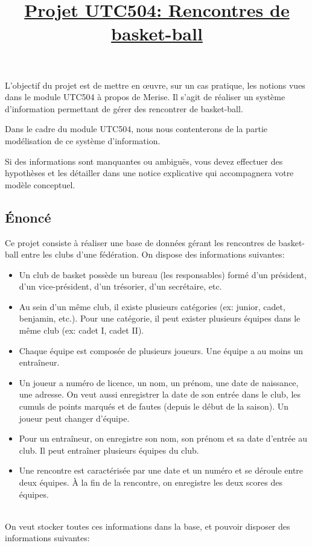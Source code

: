 \documentclass[a4,12pt]{article}
\title{\underline{Projet UTC504: Rencontres de basket-ball}}
\author{}
\date{}
\begin{document}
\maketitle

L'objectif du projet est de mettre en {\oe}uvre, sur un cas pratique, les
notions vues dans le module UTC504 à propos de Merise. Il s'agit de réaliser un
système d'information permettant de gérer des rencontrer de basket-ball.

Dans le cadre du module UTC504, nous nous contenterons de la partie modélisation
de ce système d'information.

Si des informations sont manquantes ou ambiguës, vous devez effectuer des
hypothèses et les détailler dans une notice explicative qui accompagnera votre
modèle conceptuel.

\subsection*{Énoncé}
Ce projet consiste à réaliser une base de données gérant les rencontres de
basket-ball entre les clubs d'une fédération. On dispose des informations
suivantes:
\begin{itemize}
  \item Un club de basket possède un bureau (les responsables) formé d'un
    président, d'un vice-président, d'un trésorier, d'un secrétaire, etc.
  \item Au sein d'un même club, il existe plusieurs catégories (ex: junior,
    cadet, benjamin, etc.). Pour une catégorie, il peut exister plusieurs
    équipes dans le même club (ex: cadet I, cadet II).
  \item Chaque équipe est composée de plusieurs joueurs. Une équipe a au moins
    un entraîneur.
  \item Un joueur a numéro de licence, un nom, un prénom, une date de naissance,
    une adresse. On veut aussi enregistrer la date de son entrée dans le club,
    les cumuls de points marqués et de fautes (depuis le début de la saison). Un
    joueur peut changer d'équipe.
  \item Pour un entraîneur, on enregistre son nom, son prénom et sa date
    d'entrée au club. Il peut entraîner plusieurs équipes du club.
  \item Une rencontre est caractérisée par une date et un numéro et se déroule
    entre deux équipes. À la fin de la rencontre, on enregistre les deux scores
    des équipes.
\end{itemize}
\ \\On veut stocker toutes ces informations dans la base, et pouvoir disposer des
informations suivantes:
\end{document}
